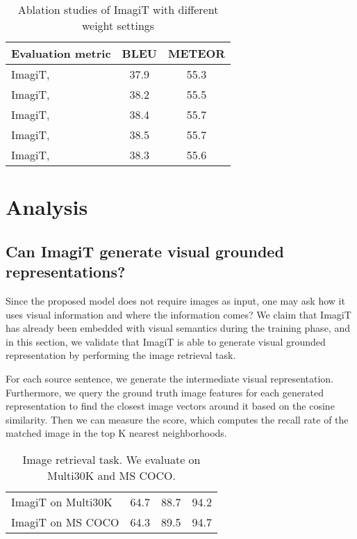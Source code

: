 \documentclass[11pt]{article}
\newcommand{\method}{ImagiT\xspace}
\begin{document}
\begin{table}[h]
\centering
\begin{tabular}{l|cc}
\hline
 Evaluation metric             & BLEU   & METEOR     \\ \hline
 ImagiT,  & 37.9 & 55.3 \\ \hline
  ImagiT,  & 38.2 & 55.5 \\ \hline
   ImagiT,  & 38.4 & 55.7 \\ \hline
    ImagiT,  & 38.5 & 55.7 \\ \hline
     ImagiT,  & 38.3 & 55.6 \\ \hline
\end{tabular}
\caption{Ablation studies of ImagiT with different weight settings}
\label{table2}
\end{table} 
\section{Analysis}
\label{sec:ana}
\subsection{Can \method generate visual grounded representations?}

Since the proposed model does not require images as input, one may ask how it uses visual information and where the information comes? We claim that \method has already been embedded with visual semantics during the training phase, and in this section, we validate that \method is able to generate visual grounded representation by performing the image retrieval task.

For each source sentence, we generate the intermediate visual representation. Furthermore, we query the ground truth image features for each generated representation to find the closest image vectors around it based on the cosine similarity. Then we can measure the  score, which computes the recall rate of the matched image in the top K nearest neighborhoods.

\begin{table}[h]
\centering
\begin{tabular}{l|ccc}
\hline
              &      &  &     \\ \hline
\method on Multi30K & 64.7  & 88.7 & 94.2 \\ \hline
\method on MS COCO & 64.3  &  89.5   & 94.7 \\
\hline
\end{tabular}
\caption{Image retrieval task. We evaluate on Multi30K and MS COCO.}
\label{retrieval}
\end{table}
\end{document}
